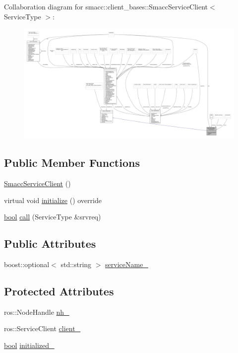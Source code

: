 Collaboration diagram for smacc\+:\+:client\+\_\+bases\+:\+:Smacc\+Service\+Client$<$ Service\+Type $>$\+:\nopagebreak
\begin{figure}[H]
\begin{center}
\leavevmode
\includegraphics[width=350pt]{classsmacc_1_1client__bases_1_1SmaccServiceClient__coll__graph}
\end{center}
\end{figure}
\subsection*{Public Member Functions}
\begin{DoxyCompactItemize}
\item 
\hyperlink{classsmacc_1_1client__bases_1_1SmaccServiceClient_ab041a903fa40cb5df251f0cd437604cc}{Smacc\+Service\+Client} ()
\item 
virtual void \hyperlink{classsmacc_1_1client__bases_1_1SmaccServiceClient_aa51b80828e4ab19627210440ae15b6f3}{initialize} () override
\item 
\hyperlink{classbool}{bool} \hyperlink{classsmacc_1_1client__bases_1_1SmaccServiceClient_a0e9914f45f1091c38bb9ad6187d07977}{call} (Service\+Type \&srvreq)
\end{DoxyCompactItemize}
\subsection*{Public Attributes}
\begin{DoxyCompactItemize}
\item 
boost\+::optional$<$ std\+::string $>$ \hyperlink{classsmacc_1_1client__bases_1_1SmaccServiceClient_a63732ec406cb8b6f65bbdbb73e01c7ab}{service\+Name\+\_\+}
\end{DoxyCompactItemize}
\subsection*{Protected Attributes}
\begin{DoxyCompactItemize}
\item 
ros\+::\+Node\+Handle \hyperlink{classsmacc_1_1client__bases_1_1SmaccServiceClient_afb62982383b8269c7962cd1588537489}{nh\+\_\+}
\item 
ros\+::\+Service\+Client \hyperlink{classsmacc_1_1client__bases_1_1SmaccServiceClient_a632093eb6bc8b058dec492b21c8536f9}{client\+\_\+}
\item 
\hyperlink{classbool}{bool} \hyperlink{classsmacc_1_1client__bases_1_1SmaccServiceClient_ad36816c62fc14380a6d0782a2592a5b4}{initialized\+\_\+}
\end{DoxyCompactItemize}


